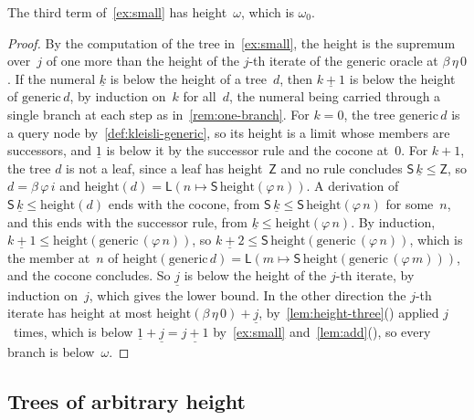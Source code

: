 \documentclass[11pt]{amsart}
\makeatletter
\newcommand{\height}{\mathrm{height}}
\newcommand{\bZ}{\mathsf{Z}}
\newcommand{\bS}{\mathsf{S}}
\newcommand{\bL}{\mathsf{L}}
\newcommand{\bplus}{\mathbin{+}}
\newcommand{\num}[1]{\underline{#1}}          %
\newcommand{\tower}[1]{\omega_{#1}}           %
\newif\ifagdarefs
\newcommand{\AgdaRefs}[1]{\ifagdarefs{\footnotesize\color{agdablue}(#1)}\else\unskip\fi}
\newcommand{\Agda}[2]{{\footnotesize\color{agdablue}\textsf{#1}%
  \ifblank{#2}{}{\texttt{.}\allowbreak\texttt{#2}}}}
\let\ttt@plain\texttt
\renewcommand{\texttt}[1]{{\footnotesize\color{agdablue}\ttt@plain{#1}}}
\theoremstyle{plain}
\theoremstyle{definition}
\makeatother
\begin{document}
\begin{proposition}
\label{prop:omega-attained}
The third term of~\cref{ex:small} has height~$\omega$, which is
$\tower 0$.
\AgdaRefs{\Agda{DialogueTrees.Examples}{iterated-height-≥};
\texttt{iterated-height-≤}.}
\end{proposition}

\begin{proof}
By the computation of the tree in~\cref{ex:small}, the height is the
supremum over~$j$ of one more than the height of the $j$-th iterate of
the generic oracle at $\beta\,\eta\,0$. If the numeral $\num k$ is
below the height of a tree~$d$, then $\num{k+1}$ is below the height
of $\mathrm{generic}\,d$, by induction on~$k$ for all~$d$, the numeral
being carried through a single branch at each step as
in~\cref{rem:one-branch}. For $k = 0$, the tree
$\mathrm{generic}\,d$ is a query node by~\cref{def:kleisli-generic},
so its height is a limit whose members are successors, and $\num 1$ is
below it by the successor rule and the cocone at~$0$. For $k+1$, the tree $d$ is not a leaf,
since a leaf has height~$\bZ$ and no rule concludes
$\bS\,\num k \le \bZ$, so $d = \beta\,\varphi\,i$ and
$\height(d) = \bL(n \mapsto \bS\,\height(\varphi\,n))$. A derivation
of $\bS\,\num k \le \height(d)$ ends with the cocone, from
$\bS\,\num k \le \bS\,\height(\varphi\,n)$ for some~$n$, and this
ends with the successor rule, from
$\num k \le \height(\varphi\,n)$. By induction,
$\num{k+1} \le \height(\mathrm{generic}\,(\varphi\,n))$, so
$\num{k+2} \le \bS\,\height(\mathrm{generic}\,(\varphi\,n))$, which is
the member at~$n$ of
$\height(\mathrm{generic}\,d)
 = \bL(m \mapsto \bS\,\height(\mathrm{generic}\,(\varphi\,m)))$, and
the cocone concludes. So $\num j$ is below the height of the $j$-th
iterate, by induction on~$j$, which gives the lower bound. In the
other direction the $j$-th iterate has height at most
$\height(\beta\,\eta\,0) \bplus \num j$,
by~\cref{lem:height-three}() applied $j$~times,
which is below $\num 1 \bplus \num j = \num{j+1}$ by~\cref{ex:small}
and~\cref{lem:add}(), so every branch is
below~$\omega$.
\AgdaRefs{\Agda{DialogueTrees.Examples}{ι-generic};
\texttt{ι-iter},
\texttt{iter-generic-≤}.}
\end{proof}

\subsection{Trees of arbitrary height}
\label{sec:trees}
\end{document}
